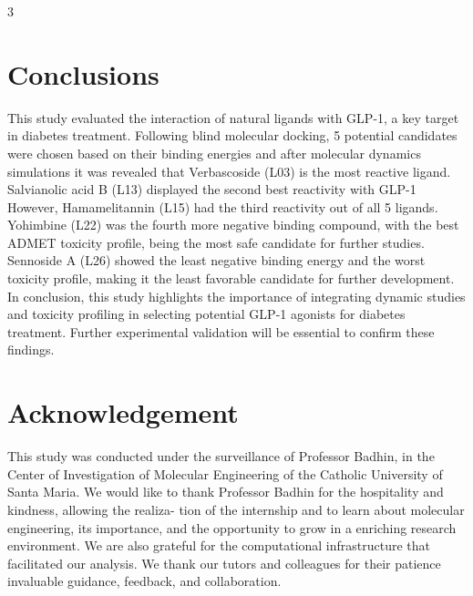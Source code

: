 \documentclass[portrait,final,20pt,ra0]{sciposter}
\begin{document}
\begin{multicols*}{3}
\section*{Conclusions}
This study evaluated the interaction of natural ligands with GLP-1, a key target in diabetes treatment. Following blind molecular docking, 5 potential candidates were chosen based on their binding energies and after molecular dynamics simulations it was revealed that Verbascoside (L03) is the most reactive ligand. Salvianolic acid B (L13) displayed the second best reactivity with GLP-1 However, Hamamelitannin (L15) had the third reactivity out of all 5 ligands. Yohimbine (L22) was the fourth more negative binding compound, with the best ADMET toxicity profile, being the most safe candidate for further studies. Sennoside A (L26) showed the least negative binding energy and the worst toxicity profile, making it the least favorable candidate for further development. In conclusion, this study highlights the importance of integrating dynamic studies and toxicity profiling in selecting potential GLP-1 agonists for diabetes treatment. Further experimental validation will be essential to confirm these findings.

\section*{Acknowledgement}%
This study was conducted under the surveillance of Professor Badhin, in the Center of Investigation of Molecular Engineering of the Catholic University of Santa Maria. We would like to thank Professor Badhin for the hospitality and kindness, allowing the realiza-
tion of the internship and to learn about molecular engineering, its importance,
and the opportunity to grow in a enriching research environment. We are also
grateful for the computational infrastructure that facilitated our analysis. We thank
our tutors and colleagues for their patience invaluable guidance, feedback, and
collaboration.
  
  
  



\end{multicols*}
\end{document}
